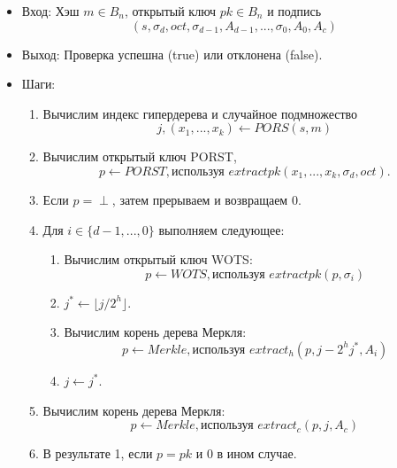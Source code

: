 \documentclass[a4paper, 14pt]{extarticle}
\begin{document}
\begin{itemize}
    \begin{itemize}
        \item Вход: Хэш $m \in B_{n}$, открытый ключ $pk \in B_{n}$ и подпись
        \[(s, \sigma_{d}, oct, \sigma_{d - 1}, A_{d - 1}, ..., \sigma_{0}, A_{0}, A_{c})\]
        \item Выход: Проверка успешна (true) или отклонена (false).
        \item Шаги:

        \begin{enumerate}
            \item Вычислим индекс гипердерева и случайное подмножество
            \[j, (x_{1}, ..., x_{k}) \leftarrow PORS(s,m)\]
    
            \item Вычислим открытый ключ PORST,
            \[p \leftarrow PORST, \text{используя } extractpk(x_{1}, ..., x_{k}, \sigma_{d}, oct).\]
    
            \item Если $p = \perp$, затем прерываем и возвращаем 0.
    
            \item Для $i \in \{d - 1, ..., 0\}$ выполняем следующее:
    
            \begin{enumerate}
                \item Вычислим открытый ключ WOTS:
                \[p \leftarrow WOTS, \text{используя } extractpk(p, \sigma_{i})\]
                \item $j^{*} \leftarrow \lfloor j/2^{h} \rfloor$.
                \item Вычислим корень дерева Меркля:
                \[p \leftarrow Merkle, \text{используя } extract_{h}(p, j - 2^{h}j^{*}, A_{i})\]
                \item $j \leftarrow j^{*}$.
            \end{enumerate}
    
            \item Вычислим корень дерева Меркля:
            \[p \leftarrow Merkle, \text{используя } extract_{c}(p, j, A_{c})\]
    
            \item В результате 1, если $p = pk$ и 0 в ином случае.
        \end{enumerate}
    \end{itemize}

    
\end{itemize}
\end{document}
